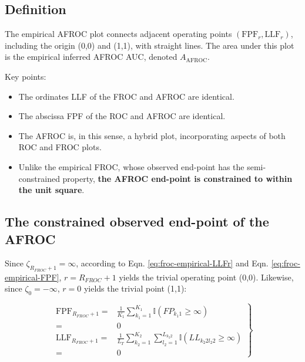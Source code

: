 \documentclass[
]{book}
\providecommand{\tightlist}{%
  \setlength{\itemsep}{0pt}\setlength{\parskip}{0pt}}
\begin{document}
\hypertarget{froc-empirical-definition-auc-AFROC}{%
\subsection{Definition}\label{froc-empirical-definition-auc-AFROC}}

The empirical AFROC plot connects adjacent operating points \(\left( \text{FPF}_r, \text{LLF}_r \right )\), including the origin (0,0) and (1,1), with straight lines. The area under this plot is the empirical inferred AFROC AUC, denoted \(A_{\text{AFROC}}\).

Key points:

\begin{itemize}
\tightlist
\item
  The ordinates LLF of the FROC and AFROC are identical.
\item
  The abscissa FPF of the ROC and AFROC are identical.
\item
  The AFROC is, in this sense, a hybrid plot, incorporating aspects of both ROC and FROC plots.
\item
  Unlike the empirical FROC, whose observed end-point has the semi-constrained property, \textbf{the AFROC end-point is constrained to within the unit square}.
\end{itemize}

\hypertarget{froc-empirical-AFROC-constrained}{%
\subsection{The constrained observed end-point of the AFROC}\label{froc-empirical-AFROC-constrained}}

Since \(\zeta_{R_{FROC}+1} = \infty\), according to Eqn. \eqref{eq:froc-empirical-LLFr} and Eqn. \eqref{eq:froc-empirical-FPF}, \(r = R_{FROC}+1\) yields the trivial operating point (0,0). Likewise, since \(\zeta_0 = -\infty\), \(r = 0\) yields the trivial point (1,1):

\begin{equation}
\left.
\begin{aligned} 
\text{FPF}_{R_{FROC}+1} =& \frac{1}{K_1} \sum_{k_1=1}^{K_1} \mathbb{I} \left ( FP_{k_1 1} \geq \infty \right )\\
=& 0\\
\text{LLF}_{R_{FROC}+1} =& \frac{1}{L_T} \sum_{k_2=1}^{K_2} \sum_{l_2=1}^{L_{k_2 2}}\mathbb{I} \left ( LL_{k_2 2 l_2 2} \geq \infty \right )\\
=& 0
\end{aligned}
\right \}
\label{eq:froc-empirical-FPF-LLF-last}
\end{equation}
\end{document}
